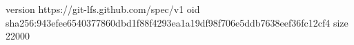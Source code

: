 version https://git-lfs.github.com/spec/v1
oid sha256:943efee6540377860dbd1f88f4293ea1a19df98f706e5ddb7638eef36fc12cf4
size 22000
